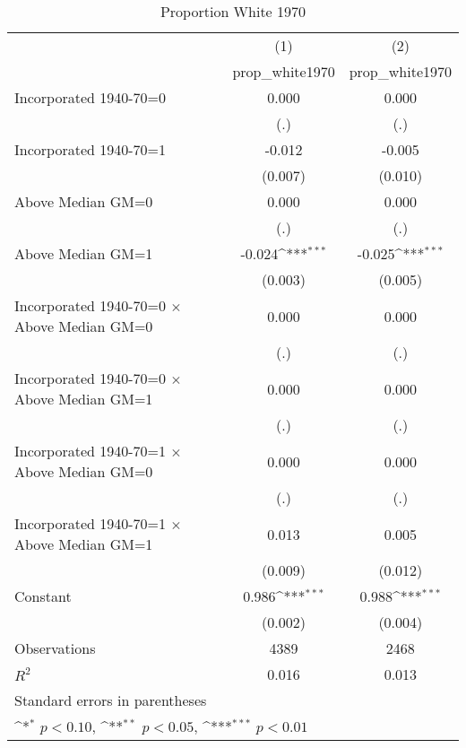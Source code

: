 \begin{table}[htbp]\centering
\def\sym#1{\ifmmode^{#1}\else\(^{#1}\)\fi}
\caption{Proportion White 1970}
\begin{tabular}{l*{2}{c}}
\hline\hline
                    &\multicolumn{1}{c}{(1)}&\multicolumn{1}{c}{(2)}\\
                    &\multicolumn{1}{c}{prop\_white1970}&\multicolumn{1}{c}{prop\_white1970}\\
\hline
Incorporated 1940-70=0&       0.000         &       0.000         \\
                    &         (.)         &         (.)         \\
[1em]
Incorporated 1940-70=1&      -0.012         &      -0.005         \\
                    &     (0.007)         &     (0.010)         \\
[1em]
Above Median GM=0   &       0.000         &       0.000         \\
                    &         (.)         &         (.)         \\
[1em]
Above Median GM=1   &      -0.024\sym{***}&      -0.025\sym{***}\\
                    &     (0.003)         &     (0.005)         \\
[1em]
Incorporated 1940-70=0 $\times$ Above Median GM=0&       0.000         &       0.000         \\
                    &         (.)         &         (.)         \\
[1em]
Incorporated 1940-70=0 $\times$ Above Median GM=1&       0.000         &       0.000         \\
                    &         (.)         &         (.)         \\
[1em]
Incorporated 1940-70=1 $\times$ Above Median GM=0&       0.000         &       0.000         \\
                    &         (.)         &         (.)         \\
[1em]
Incorporated 1940-70=1 $\times$ Above Median GM=1&       0.013         &       0.005         \\
                    &     (0.009)         &     (0.012)         \\
[1em]
Constant            &       0.986\sym{***}&       0.988\sym{***}\\
                    &     (0.002)         &     (0.004)         \\
\hline
Observations        &        4389         &        2468         \\
\(R^{2}\)           &       0.016         &       0.013         \\
\hline\hline
\multicolumn{3}{l}{\footnotesize Standard errors in parentheses}\\
\multicolumn{3}{l}{\footnotesize \sym{*} \(p<0.10\), \sym{**} \(p<0.05\), \sym{***} \(p<0.01\)}\\
\end{tabular}
\end{table}

